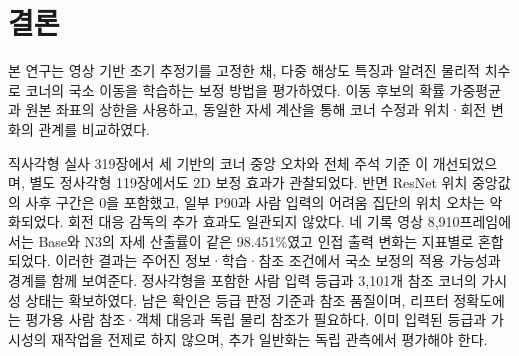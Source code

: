 \section{결론}\label{sec:conclusion}
본 연구는 영상 기반 초기 추정기를 고정한 채, 다중 해상도 특징과 알려진 물리적 치수로 코너의 국소 이동을 학습하는 보정 방법을 평가하였다. 이동 후보의 확률 가중평균과 원본 좌표의 상한을 사용하고, 동일한 자세 계산을 통해 코너 수정과 위치·회전 변화의 관계를 비교하였다.

직사각형 실사 319장에서 세 기반의 코너 중앙 오차와 전체 주석 기준 \pckten 이 개선되었으며, 별도 정사각형 119장에서도 2D 보정 효과가 관찰되었다. 반면 ResNet 위치 중앙값의 사후 구간은 0을 포함했고, 일부 P90과 사람 입력의 어려움 집단의 위치 오차는 악화되었다. 회전 대응 감독의 추가 효과도 일관되지 않았다. 네 기록 영상 8,910프레임에서는 Base와 N3의 자세 산출률이 같은 98.451\%였고 인접 출력 변화는 지표별로 혼합되었다. 이러한 결과는 주어진 정보·학습·참조 조건에서 국소 보정의 적용 가능성과 경계를 함께 보여준다. 정사각형을 포함한 사람 입력 등급과 3,101개 참조 코너의 가시성 상태는 확보하였다. 남은 확인은 등급 판정 기준과 참조 품질이며, 리프터 정확도에는 평가용 사람 참조·객체 대응과 독립 물리 참조가 필요하다. 이미 입력된 등급과 가시성의 재작업을 전제로 하지 않으며, 추가 일반화는 독립 관측에서 평가해야 한다.
